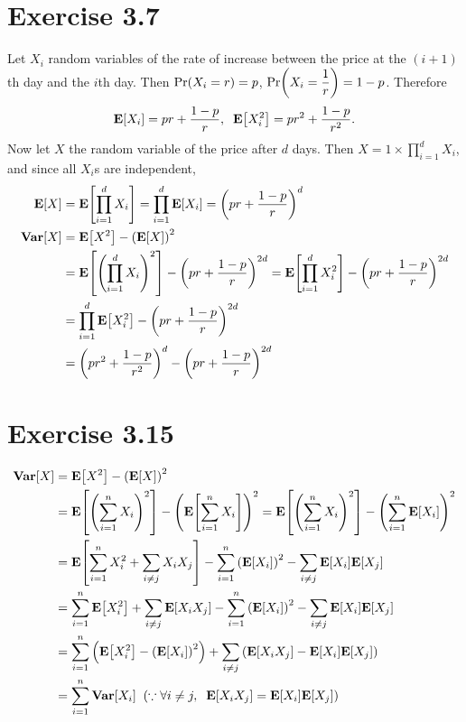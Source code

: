 \documentclass{article}
\begin{document}
\section*{Exercise 3.7}
Let $X_i$ random variables of the rate of increase between the price at the $(i+1)$th day and the $i$th day.
Then $\mathrm{Pr}\qty(X_i = r) = p$, $\mathrm{Pr}\qty(X_i = \dfrac{1}{r}) = 1-p$. Therefore
$$\mathbf{E}\qty[X_i] = pr + \frac{1-p}{r}, \;\; \mathbf{E}\qty[X_i^2] = pr^2 + \frac{1-p}{r^2}.$$
Now let $X$ the random variable of the price after $d$ days. Then $X = 1 \times \prod_{i=1}^{d}X_i$, and since all $X_i$s are independent,
\begin{align*}
  \mathbf{E}\qty[X] &= \mathbf{E}\qty[\prod_{i=1}^{d}X_i] = \prod_{i=1}^{d}\mathbf{E}\qty[X_i] = \qty(pr + \frac{1-p}{r})^d \\
  \mathbf{Var}\qty[X] &= \mathbf{E}\qty[X^2] - \qty(\mathbf{E}\qty[X])^2 \\
  &= \mathbf{E}\qty[\qty(\prod_{i=1}^{d}X_i)^2] - \qty(pr + \frac{1-p}{r})^{2d} = \mathbf{E}\qty[\prod_{i=1}^{d}X_i^2] - \qty(pr + \frac{1-p}{r})^{2d} \\
  &= \prod_{i=1}^{d}\mathbf{E}\qty[X_i^2] - \qty(pr + \frac{1-p}{r})^{2d} \\
  &= \qty(pr^2 + \frac{1-p}{r^2})^d - \qty(pr + \frac{1-p}{r})^{2d}
\end{align*}

\section*{Exercise 3.15}
\begin{align*}
  \mathbf{Var}\qty[X] &= \mathbf{E}\qty[X^2] - \qty(\mathbf{E}\qty[X])^2 \\
  &= \mathbf{E}\qty[\qty(\sum_{i=1}^{n}X_i)^2] - \qty(\mathbf{E}\qty[\sum_{i=1}^{n}X_i])^2 = \mathbf{E}\qty[\qty(\sum_{i=1}^{n}X_i)^2] - \qty(\sum_{i=1}^{n}\mathbf{E}\qty[X_i])^2 \\
  &= \mathbf{E}\qty[\sum_{i=1}^{n}X_i^2 + \sum_{i \neq j}X_iX_j] - \sum_{i=1}^{n}\qty(\mathbf{E}\qty[X_i])^2 - \sum_{i \neq j}\mathbf{E}\qty[X_i]\mathbf{E}\qty[X_j] \\
  &= \sum_{i=1}^{n}\mathbf{E}\qty[X_i^2] + \sum_{i \neq j}\mathbf{E}\qty[X_iX_j] - \sum_{i=1}^{n}\qty(\mathbf{E}\qty[X_i])^2 - \sum_{i \neq j}\mathbf{E}\qty[X_i]\mathbf{E}\qty[X_j] \\
  &= \sum_{i=1}^{n}\qty(\mathbf{E}\qty[X_i^2] - \qty(\mathbf{E}\qty[X_i])^2) + \sum_{i \neq j}\qty(\mathbf{E}\qty[X_iX_j] - \mathbf{E}\qty[X_i]\mathbf{E}\qty[X_j]) \\
  &= \sum_{i=1}^{n}\mathbf{Var}\qty[X_i] \;\; \qty(\because \forall i \neq j, \;\; \mathbf{E}\qty[X_iX_j] = \mathbf{E}\qty[X_i]\mathbf{E}\qty[X_j])
\end{align*}
\end{document}
